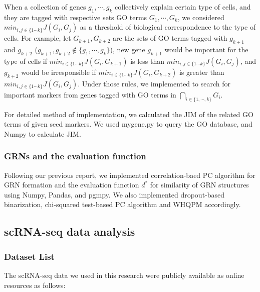 \documentclass{article}
\begin{document}
When a collection of genes $g_1, \cdots, g_k$ collectively explain certain type of cells, and they are tagged with respective 
sets GO terms $G_1, \cdots, G_k$, we considered $min_{i,j\in\{1\cdots k\}}J(G_i, G_j)$ as a threshold of biological correspondence to the 
type of cells. For example, let $G_{k+1}, G_{k+2}$ are the sets of GO terms tagged with $g_{k+1}$ and $g_{k+2}$ 
($g_{k+1}, g_{k+2}\notin \{g_1, \cdots, g_k\}$), new gene $g_{k+1}$ would be important for the type of cells if $min_{i\in\{1\cdots k\}}J(G_i, G_{k+1})$ 
is less than $min_{i,j\in\{1\cdots k\}}J(G_i, G_j)$, and $g_{k+2}$ would be irresponsible if $min_{i\in\{1\cdots k\}}J(G_i, G_{k+2})$ is greater than 
$min_{i,j\in\{1\cdots k\}}J(G_i, G_j)$. Under those rules, we implemented to search for important markers from genes tagged 
with GO terms in $\bigcap_{i\in\{1,\cdots,k\}}G_i$.

For detailed method of implementation, we calculated the JIM of the related GO terms of given seed markers. 
We used mygene.py\cite{mygene} to query the GO database, and Numpy\cite{numpy} to calculate JIM.

\subsubsection*{GRNs and the evaluation function}
Following our previous report\cite{okano2023set}, we implemented correlation-baed PC algorithm for GRN formation and the evaluation 
function $d^*$ for similarity of GRN structures using Numpy, Pandas\cite{pandas}, and pgmpy. We also implemented dropout-based binarization, 
chi-squared test-based PC algorithm and WHQPM accordingly.


\subsection*{scRNA-seq data analysis}
\subsubsection*{Dataset List}
The scRNA-seq data we used in this research were publicly available as online
resources as follows:
\end{document}
